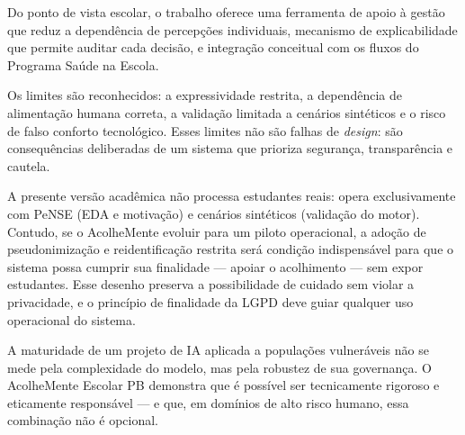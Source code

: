 \documentclass[
    12pt,
    openright,
    oneside,
    a4paper,
    english,
    brazil
]{abntex2}
\begin{document}
Do ponto de vista escolar, o trabalho oferece uma ferramenta de apoio \`a gest\~ao que reduz a depend\^encia de percep\c{c}\~oes individuais, mecanismo de explicabilidade que permite auditar cada decis\~ao, e integra\c{c}\~ao conceitual com os fluxos do Programa Sa\'ude na Escola.

Os limites s\~ao reconhecidos: a expressividade restrita, a depend\^encia de alimenta\c{c}\~ao humana correta, a valida\c{c}\~ao limitada a cen\'arios sint\'eticos e o risco de falso conforto tecnol\'ogico. Esses limites n\~ao s\~ao falhas de \textit{design}: s\~ao consequ\^encias deliberadas de um sistema que prioriza seguran\c{c}a, transpar\^encia e cautela.

A presente vers\~ao acad\^emica n\~ao processa estudantes reais: opera exclusivamente com PeNSE (EDA e motiva\c{c}\~ao) e cen\'arios sint\'eticos (valida\c{c}\~ao do motor). Contudo, se o AcolheMente evoluir para um piloto operacional, a ado\c{c}\~ao de pseudonimiza\c{c}\~ao e reidentifica\c{c}\~ao restrita ser\'a condi\c{c}\~ao indispens\'avel para que o sistema possa cumprir sua finalidade --- apoiar o acolhimento --- sem expor estudantes. Esse desenho preserva a possibilidade de cuidado sem violar a privacidade, e o princ\'ipio de finalidade da LGPD \cite{brasil_lgpd_2018} deve guiar qualquer uso operacional do sistema.

A maturidade de um projeto de IA aplicada a popula\c{c}\~oes vulner\'aveis n\~ao se mede pela complexidade do modelo, mas pela robustez de sua governan\c{c}a. O AcolheMente Escolar PB demonstra que \'e poss\'ivel ser tecnicamente rigoroso e eticamente respons\'avel --- e que, em dom\'inios de alto risco humano, essa combina\c{c}\~ao n\~ao \'e opcional.



\end{document}
